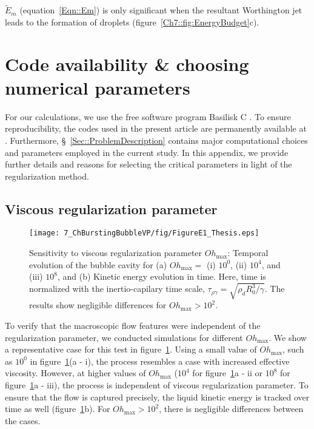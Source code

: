 \begin{subappendices}
\noindent$\tilde E_m$ (equation~\eqref{Eqn::Em}) is only significant when the resultant Worthington jet leads to the formation of droplets (figure~\ref{Ch7::fig:EnergyBudget}c). 

\section{Code availability \& choosing numerical parameters}\label{App::codes}

For our calculations, we use the free software program Basilisk C \citep{basiliskpopinet1, popinet2015quadtree}. To ensure reproducibility, the codes used in the present article are permanently available at \citet{basiliskVatsalVP}. Furthermore, \S~\ref{Sec::ProblemDescription} contains major computational choices and parameters employed in the current study. In this appendix, we provide further details and reasons for selecting the critical parameters in light of the regularization method. 

\subsection{Viscous regularization parameter}\label{App::OhMax}

\begin{figure}
	\centering
	\texttt{[image: 7\_ChBurstingBubbleVP/fig/FigureE1\_Thesis.eps]}
	\caption{Sensitivity to viscous regularization parameter $Oh_{\text{max}}$: Temporal evolution of the bubble cavity for (a) $Oh_{\text{max}} =$ (i) $10^0$, (ii) $10^4$, and (iii) $10^8$, and (b) Kinetic energy evolution in time. Here, time is normalized with the inertio-capilary time scale, $\tau_{\rho\gamma} = \sqrt{\rho_d R_0^3/\gamma}$. The results show negligible differences for $Oh_{\text{max}} > 10^2$.}
	\label{fig:OhMax}
\end{figure}

To verify that the macroscopic flow features were independent of the regularization parameter, we conducted simulations for different $Oh_\text{max}$. We show a representative case for this test in figure~\ref{fig:OhMax}. Using a small value of $Oh_\text{max}$, such as $10^0$ in figure~\ref{fig:OhMax}(a - i), the process resembles a case with increased effective viscosity. However, at higher values of $Oh_\text{max}$ ($10^4$ for figure~\ref{fig:OhMax}a - ii or $10^8$ for figure~\ref{fig:OhMax}a - iii), the process is independent of viscous regularization parameter. To ensure that the flow is captured precisely, the liquid kinetic energy is tracked over time as well (figure~\ref{fig:OhMax}b). For $Oh_{\text{max}} > 10^2$, there is negligible differences between the cases. 


\end{subappendices}
